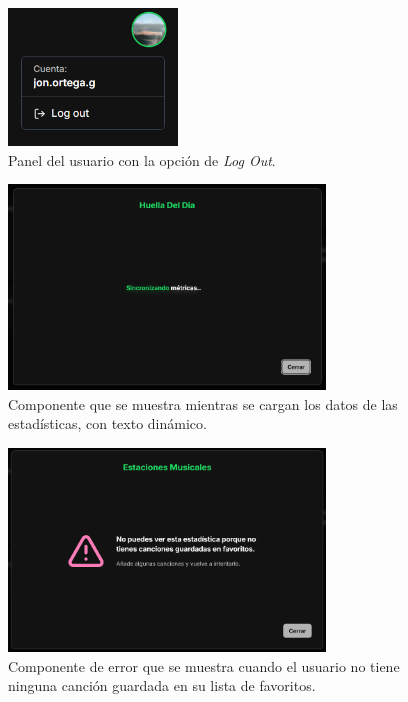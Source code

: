 \begin{figure}[H]
    \centering
    \vspace{-10pt}
    \includegraphics[width=0.4\textwidth]{figures/capturas_ui/user_action_panel.png}
    \caption{Panel del usuario con la opción de \textit{Log Out}.}
    \label{fig:user_action_panel}
\end{figure}

\begin{figure}[H]
    \centering
    \vspace{-10pt}
    \includegraphics[width=0.75\textwidth]{figures/capturas_ui/pantalla_carga.png}
    \caption{Componente que se muestra mientras se cargan los datos de las estadísticas, con texto dinámico.}
    \label{fig:pantalla_carga}
\end{figure}

\begin{figure}[H]
    \centering
    \vspace{-10pt}
    \includegraphics[width=0.75\textwidth]{figures/capturas_ui/error_no_favoritos.png}
    \caption{Componente de error que se muestra cuando el usuario no tiene ninguna canción guardada en su lista de favoritos.}
    \label{fig:error_no_favoritos}
\end{figure}

